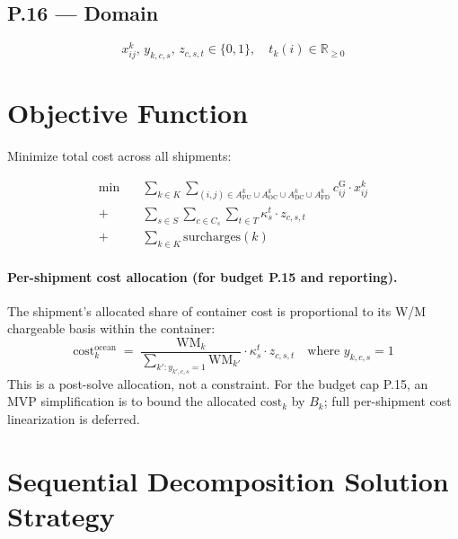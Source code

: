 \documentclass[11pt,a4paper]{article}
\theoremstyle{definition}
\begin{document}
\subsection*{P.16 — Domain}

\begin{equation}
  x_{ij}^k,\, y_{k,c,s},\, z_{c,s,t} \in \{0,1\}, \quad t_k(i) \in \mathbb{R}_{\geq 0}
  \label{eq:lcl-P16}
\end{equation}

\section{Objective Function}

Minimize total cost across all shipments:

\begin{align}
  \min \quad
  & \sum_{k \in K} \sum_{(i,j) \in A^k_{\text{PU}} \cup A^k_{\text{OC}} \cup A^k_{\text{DC}} \cup A^k_{\text{FD}}}
    c_{ij}^{\text{G}} \cdot x_{ij}^k
    \tag{ground cost} \\
  +\;
  & \sum_{s \in S} \sum_{c \in C_s} \sum_{t \in T} \kappa_s^t \cdot z_{c,s,t}
    \tag{container cost (NVOCC pays per container, not per CBM)} \\
  +\;
  & \sum_{k \in K} \text{surcharges}(k)
    \tag{per-shipment surcharges (THC, ISPS, etc.)}
\end{align}

\paragraph{Per-shipment cost allocation (for budget P.15 and reporting).}
The shipment's allocated share of container cost is proportional to its W/M chargeable basis
within the container:
\begin{equation}
  \text{cost}_k^{\text{ocean}} \;=\; \frac{\text{WM}_k}{\sum_{k' : y_{k',c,s}=1} \text{WM}_{k'}}
  \cdot \kappa_s^t \cdot z_{c,s,t}
  \quad \text{where } y_{k,c,s} = 1
\end{equation}
This is a post-solve allocation, not a constraint. For the budget cap P.15, an MVP
simplification is to bound the allocated $\text{cost}_k$ by $B_k$; full per-shipment cost
linearization is deferred.

\section{Sequential Decomposition Solution Strategy}
\label{sec:decomposition}
\end{document}
